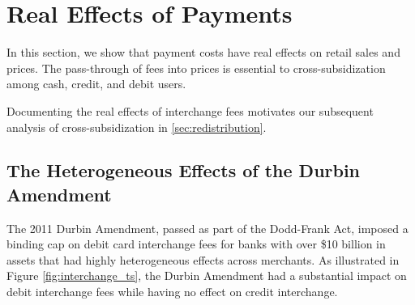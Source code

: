 \documentclass[main.tex]{subfiles}
\begin{document}
\section{Real Effects of Payments\label{sec:real_effects}}

In this section, we show that payment costs have real effects on retail sales and prices.
The pass-through of fees into prices is essential to cross-subsidization among cash, credit, and debit users.

Documenting the real effects of interchange fees motivates our subsequent analysis of cross-subsidization in \ref{sec:redistribution}.

\subsection{The Heterogeneous Effects of the Durbin Amendment}


The 2011 Durbin Amendment, passed as part of the Dodd-Frank Act, imposed a binding cap on debit card interchange fees for banks with over \$10 billion in assets that had highly heterogeneous effects across merchants.
As illustrated in Figure \ref{fig:interchange_ts}, the Durbin Amendment had a substantial impact on debit interchange fees while having no effect on credit interchange.

\end{document}

